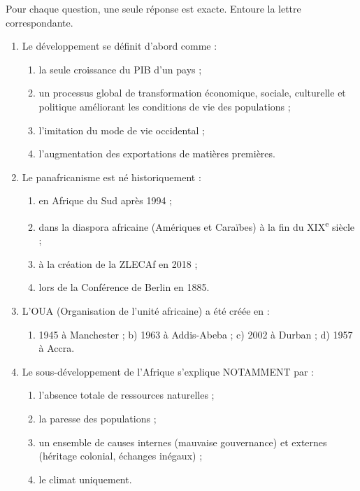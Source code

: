 \documentclass[11pt]{article}
\begin{document}
\begin{exercice}
Pour chaque question, une seule réponse est exacte. Entoure la lettre correspondante.
\begin{enumerate}
\item Le développement se définit d'abord comme :
\begin{enumerate}
\item[a)] la seule croissance du PIB d'un pays ;
\item[b)] un processus global de transformation économique, sociale, culturelle et politique améliorant les conditions de vie des populations ;
\item[c)] l'imitation du mode de vie occidental ;
\item[d)] l'augmentation des exportations de matières premières.
\end{enumerate}
\item Le panafricanisme est né historiquement :
\begin{enumerate}
\item[a)] en Afrique du Sud après 1994 ;
\item[b)] dans la diaspora africaine (Amériques et Caraïbes) à la fin du XIX\textsuperscript{e} siècle ;
\item[c)] à la création de la ZLECAf en 2018 ;
\item[d)] lors de la Conférence de Berlin en 1885.
\end{enumerate}
\item L'OUA (Organisation de l'unité africaine) a été créée en :
\begin{enumerate}
\item[a)] 1945 à Manchester ; \quad b) 1963 à Addis-Abeba ; \quad c) 2002 à Durban ; \quad d) 1957 à Accra.
\end{enumerate}
\item Le sous-développement de l'Afrique s'explique NOTAMMENT par :
\begin{enumerate}
\item[a)] l'absence totale de ressources naturelles ;
\item[b)] la paresse des populations ;
\item[c)] un ensemble de causes internes (mauvaise gouvernance) et externes (héritage colonial, échanges inégaux) ;
\item[d)] le climat uniquement.
\end{enumerate}
\end{enumerate}
\end{exercice}
\end{document}
